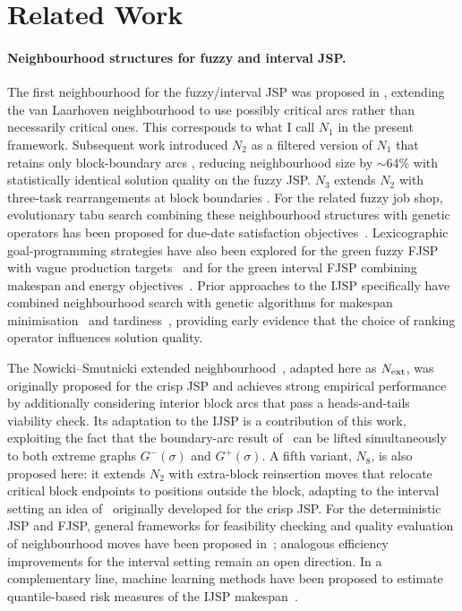 \documentclass[preprint,12pt]{elsarticle}
\begin{document}
\section{Related Work}
\label{sec:rw}

\paragraph{Neighbourhood structures for fuzzy and interval JSP.}
The first neighbourhood for the fuzzy/interval JSP was proposed in \cite{GonzalezRodriguez2008}, extending the van Laarhoven neighbourhood \cite{vanLaarhoven1992} to use possibly critical arcs rather than necessarily critical ones. This corresponds to what I call $N_1$ in the present framework. Subsequent work introduced $N_2$ as a filtered version of $N_1$ that retains only block-boundary arcs \cite{N2fjsp}, reducing neighbourhood size by $\sim$64\% with statistically identical solution quality on the fuzzy JSP. $N_3$ extends $N_2$ with three-task rearrangements at block boundaries \cite{N3fjsp}. For the related fuzzy job shop, evolutionary tabu search combining these neighbourhood structures with genetic operators has been proposed for due-date satisfaction objectives~\cite{Vela2020}. Lexicographic goal-programming strategies have also been explored for the green fuzzy FJSP with vague production targets~\cite{GarciaGomez2026Ann} and for the green interval FJSP combining makespan and energy objectives~\cite{Afsar2025}. Prior approaches to the IJSP specifically have combined neighbourhood search with genetic algorithms for makespan minimisation~\cite{DiazIPMU2020} and tardiness~\cite{DiazHAIS2020}, providing early evidence that the choice of ranking operator influences solution quality.

The Nowicki--Smutnicki extended neighbourhood~\cite{Nowicki2005}, adapted here as $N_{\rm ext}$, was originally proposed for the crisp JSP and achieves strong empirical performance by additionally considering interior block arcs that pass a heads-and-tails viability check. Its adaptation to the IJSP is a contribution of this work, exploiting the fact that the boundary-arc result of~\cite{Nowicki1996} can be lifted simultaneously to both extreme graphs $G^-(\sigma)$ and $G^+(\sigma)$. A fifth variant, $N_8$, is also proposed here: it extends $N_2$ with extra-block reinsertion moves that relocate critical block endpoints to positions outside the block, adapting to the interval setting an idea of~\cite{Xie2022} originally developed for the crisp JSP. For the deterministic JSP and FJSP, general frameworks for feasibility checking and quality evaluation of neighbourhood moves have been proposed in~\cite{Tamssaouet2023,GarciaGomez2026}; analogous efficiency improvements for the interval setting remain an open direction. In a complementary line, machine learning methods have been proposed to estimate quantile-based risk measures of the IJSP makespan~\cite{Calamita2025}.
\end{document}
